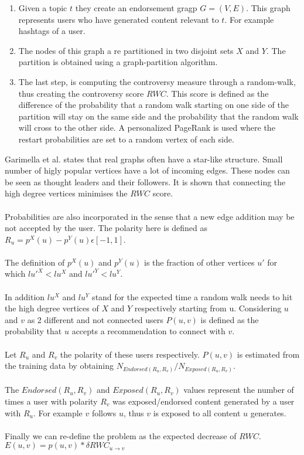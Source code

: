 \begin{enumerate}
  \item Given a topic $t$ they create an endorsement gragp $G=(V,E)$. This graph represents users who have generated content relevant to $t$. For example hashtags of a user.
  
  \item The nodes of this graph a re partitioned in two disjoint sets $X$ and $Y$. The partition is obtained using a graph-partition algorithm.
  
  \item The last step, is computing the controversy measure through a random-walk, thus creating the controversy score $RWC$. This score is defined as the difference of the probability that a random walk starting on one side of the partition will stay on the same side and the probability that the random walk will cross to the other side. A personalized PageRank is used where the restart probabilities are set to a random vertex of each side.
\end{enumerate}
\vspace{4pt}
Garimella et al. states that real graphs often have a star-like structure. Small number of higly popular vertices have a lot of incoming edges. These nodes can be seen as thought leaders and their followers. It is shown that connecting the high degree vertices minimises the $RWC$ score.
\\
\\
Probabilities are also incorporated in the sense that a new edge addition may be not accepted by the user. The polarity here is defined as $R_u= p^X(u) - p^Y(u) \epsilon [-1,1]$. 
\\
\\
The definition of $p^X(u)$ and $p^Y(u)$ is the fraction of other vertices $u'$ for which $lu'^X<lu^X$ and $lu'^Y<lu^Y$. 
\\
\\
In addition $lu^X$ and $lu^Y$ stand for the expected time a random walk needs to hit the high degree vertices of $X$ and $Y$ respectively starting from u. Considering $u$ and $v$ as 2 different and not connected users $P(u, v)$ is defined as the probability that $u$ accepts a recommendation to connect with $v$.
 \\
 \\
 Let $R_u$ and $R_v$ the polarity of these users respectively. $P(u, v)$ is estimated from the training data by obtaining $N_{Endorsed(R_u,R_v)} / N_{Exposed(R_u,R_v)}$.
 \\
 \\
The $Endorsed(R_u,R_v)$ and $Exposed(R_u,R_v)$ values represent the number of times a user with polarity $R_v$ was exposed/endorsed content generated by a user with $R_u$. For example $v$ follows $u$, thus $v$ is exposed to all content $u$ generates.
\\
\\ 
Finally we can re-define the problem as the expected decrease of $RWC$.
$E(u,v) = p(u,v) * δRWC_{u \rightarrow v}$

